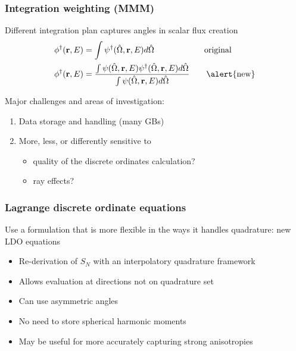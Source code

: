 \documentclass[xcolor=x11names,compress]{beamer}
\renewcommand{\(}{\begin{columns}}
\renewcommand{\)}{\end{columns}}
\newcommand{\<}[1]{\begin{column}{#1}}
\renewcommand{\>}{\end{column}}
\newcommand{\vOmega}{\ensuremath{\hat{\Omega}}}
\newcommand{\ve}[1]{\ensuremath{\mathbf{#1}}}
\begin{document}
\begin{frame}[fragile]
  \frametitle{Integration weighting (MMM)}

    Different integration plan captures angles in scalar flux creation	
	\begin{align*}
		\phi^{\dagger}(\ve{r},E) &= \int \psi^{\dagger}(\vOmega, 
		\ve{r},E) d\vOmega \qquad  \qquad \qquad \text{original}\\
		\phi^{\dagger}(\ve{r},E) &= \frac{\int \psi(\vOmega, \ve{r},E)
		 \psi^{\dagger}(\vOmega, \ve{r},E) d\vOmega}{\int \psi(\vOmega, 
		 \ve{r},E)  d\vOmega} \qquad \text{\alert{new}}
	\end{align*}

    \pause
    Major challenges and areas of investigation:
	\begin{enumerate}
	\item Data storage and handling (many GBs)
	\item More, less, or differently sensitive to 
	  \begin{itemize}
	  \item quality of the discrete ordinates calculation?
	  \item ray effects?
	  \end{itemize}
	\end{enumerate}

\end{frame}

\begin{frame}[fragile]
  \frametitle{Lagrange discrete ordinate equations}

    Use a formulation that is more flexible in the ways 
	it handles quadrature: new LDO equations \cite{Ahrens2014}
	\vspace*{1 em}
	
	\begin{itemize}
	\item Re-derivation of $S_N$ with an \alert{interpolatory quadrature framework}
	\item Allows evaluation at directions not on quadrature set
	\item Can use \alert{asymmetric angles}
	\item No need to store spherical harmonic moments
	\item May be useful for more accurately capturing strong anisotropies
	\end{itemize}

\end{frame}
\end{document}
